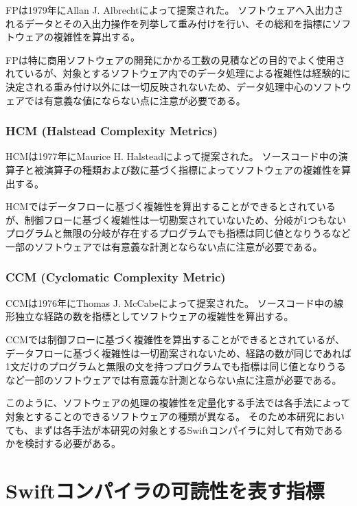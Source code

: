 FPは1979年にAllan J. Albrechtによって提案された。
ソフトウェアへ入出力されるデータとその入出力操作を列挙して重み付けを行い、その総和を指標にソフトウェアの複雑性を算出する。

FPは特に商用ソフトウェアの開発にかかる工数の見積などの目的でよく使用されているが、対象とするソフトウェア内でのデータ処理による複雑性は経験的に決定される重み付け以外には一切反映されないため、データ処理中心のソフトウェアでは有意義な値にならない点に注意が必要である。

\subsubsection{HCM (Halstead Complexity Metrics)}

HCMは1977年にMaurice H. Halsteadによって提案された。
ソースコード中の演算子と被演算子の種類および数に基づく指標によってソフトウェアの複雑性を算出する。

HCMではデータフローに基づく複雑性を算出することができるとされているが、制御フローに基づく複雑性は一切勘案されていないため、分岐が1つもないプログラムと無限の分岐が存在するプログラムでも指標は同じ値となりうるなど一部のソフトウェアでは有意義な計測とならない点に注意が必要である。

\subsubsection{CCM (Cyclomatic Complexity Metric)}

CCMは1976年にThomas J. McCabeによって提案された。
ソースコード中の線形独立な経路の数を指標としてソフトウェアの複雑性を算出する。

CCMでは制御フローに基づく複雑性を算出することができるとされているが、データフローに基づく複雑性は一切勘案されないため、経路の数が同じであれば1文だけのプログラムと無限の文を持つプログラムでも指標は同じ値となりうるなど一部のソフトウェアでは有意義な計測とならない点に注意が必要である。

\vspace{2em}

このように、ソフトウェアの処理の複雑性を定量化する手法では各手法によって対象とすることのできるソフトウェアの種類が異なる。
そのため本研究においても、まずは各手法が本研究の対象とするSwiftコンパイラに対して有効であるかを検討する必要がある。


\section{Swiftコンパイラの可読性を表す指標}
\label{issue:barometer}

